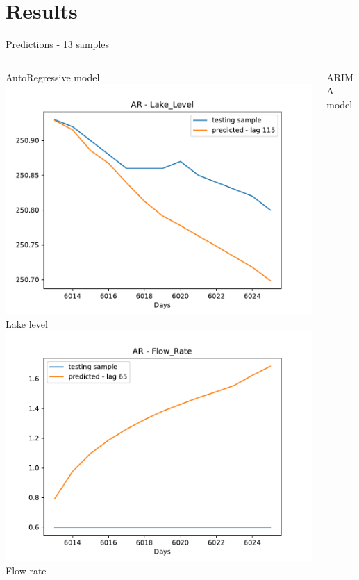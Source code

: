 \documentclass[aspectratio=169, glossy]{beamer}
\begin{document}
\section{Results}

\begin{frame}{Predictions - 13 samples}
  \begin{columns}
    \begin{column}{0.5\columnwidth}
      \begin{center}
        \vspace{-1em}
        AutoRegressive model\\
        \vspace{0.5em}
        \includegraphics[width=0.5\columnwidth]{../plots/ar_lake_level_prediction.pdf}\\
        \tiny{Lake level}\\
        \vspace{0.5em}
        \includegraphics[width=0.5\columnwidth]{../plots/ar_flow_rate_prediction.pdf}\\
        \tiny{Flow rate}
      \end{center}
    \end{column}
    \begin{column}{0.5\columnwidth}
      \begin{center}
        \vspace{-1em}
        ARIMA model\\

\end{center}
\end{column}
\end{columns}
\end{frame}
\end{document}
